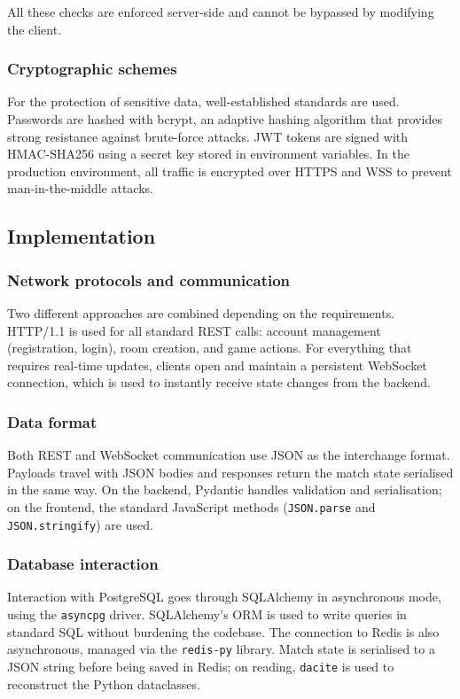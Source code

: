 \documentclass{scrartcl}
\begin{document}
All these checks are enforced server-side and cannot be bypassed
by modifying the client.

\subsubsection*{Cryptographic schemes}

For the protection of sensitive data, well-established standards are used.
Passwords are hashed with bcrypt, an adaptive hashing algorithm that provides
strong resistance against brute-force attacks.
JWT tokens are signed with HMAC-SHA256 using a secret key stored
in environment variables.
In the production environment, all traffic is encrypted over HTTPS and WSS
to prevent man-in-the-middle attacks.

\subsection{Implementation}\label{implementation}

\subsubsection*{Network protocols and communication}

Two different approaches are combined depending on the requirements.
HTTP/1.1 is used for all standard REST calls: account management
(registration, login), room creation, and game actions.
For everything that requires real-time updates, clients open and maintain
a persistent WebSocket connection, which is used to instantly receive
state changes from the backend.

\subsubsection*{Data format}

Both REST and WebSocket communication use JSON as the interchange format.
Payloads travel with JSON bodies and responses return the match state
serialised in the same way.
On the backend, Pydantic handles validation and serialisation;
on the frontend, the standard JavaScript methods
(\texttt{JSON.parse} and \texttt{JSON.stringify}) are used.

\subsubsection*{Database interaction}

Interaction with PostgreSQL goes through SQLAlchemy in asynchronous mode,
using the \texttt{asyncpg} driver.
SQLAlchemy's ORM is used to write queries in standard SQL without
burdening the codebase.
The connection to Redis is also asynchronous, managed via the \texttt{redis-py}
library.
Match state is serialised to a JSON string before being saved in Redis;
on reading, \texttt{dacite} is used to reconstruct the Python dataclasses.
\end{document}
